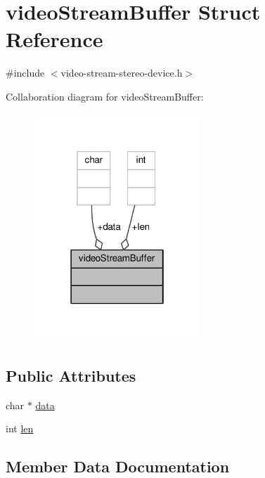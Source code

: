 \hypertarget{structvideoStreamBuffer}{}\section{video\+Stream\+Buffer Struct Reference}
\label{structvideoStreamBuffer}


{\ttfamily \#include $<$video-\/stream-\/stereo-\/device.\+h$>$}



Collaboration diagram for video\+Stream\+Buffer\+:
\nopagebreak
\begin{figure}[H]
\begin{center}
\leavevmode
\includegraphics[width=178pt]{structvideoStreamBuffer__coll__graph}
\end{center}
\end{figure}
\subsection*{Public Attributes}
\begin{DoxyCompactItemize}
\item 
char $\ast$ \hyperlink{structvideoStreamBuffer_a2854e01e5c157423b0b8e84f3b264daa}{data}
\item 
int \hyperlink{structvideoStreamBuffer_a9c5bdf26c0bea4bb642eab19ef08213f}{len}
\end{DoxyCompactItemize}


\subsection{Member Data Documentation}
